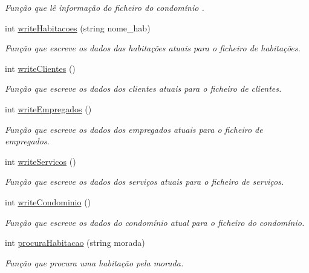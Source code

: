 \begin{DoxyCompactItemize}
\begin{DoxyCompactList}\small\item\em Função que lê informação do ficheiro do condomínio . \end{DoxyCompactList}\item 
int \hyperlink{class_interface_ab958fd934d292ca384de456f3a0e2887}{write\+Habitacoes} (string nome\+\_\+hab)
\begin{DoxyCompactList}\small\item\em Função que escreve os dados das habitações atuais para o ficheiro de habitações. \end{DoxyCompactList}\item 
int \hyperlink{class_interface_a8e61f486409d01cb374ad5abf4d019ce}{write\+Clientes} ()
\begin{DoxyCompactList}\small\item\em Função que escreve os dados dos clientes atuais para o ficheiro de clientes. \end{DoxyCompactList}\item 
int \hyperlink{class_interface_ac720fe22aaab1baed246761e2e5cff08}{write\+Empregados} ()
\begin{DoxyCompactList}\small\item\em Função que escreve os dados dos empregados atuais para o ficheiro de empregados. \end{DoxyCompactList}\item 
int \hyperlink{class_interface_a246699e8b6e64e72e6134ab9e159bbdf}{write\+Servicos} ()
\begin{DoxyCompactList}\small\item\em Função que escreve os dados dos serviços atuais para o ficheiro de serviços. \end{DoxyCompactList}\item 
int \hyperlink{class_interface_a4ea6569a9bce79db7d0135efc0778124}{write\+Condominio} ()
\begin{DoxyCompactList}\small\item\em Função que escreve os dados do condomínio atual para o ficheiro do condomínio. \end{DoxyCompactList}\item 
int \hyperlink{class_interface_ac6040bbfe9d93dbe66073486895b350f}{procura\+Habitacao} (string morada)
\begin{DoxyCompactList}\small\item\em Função que procura uma habitação pela morada. \end{DoxyCompactList}\item 

\end{DoxyCompactItemize}
